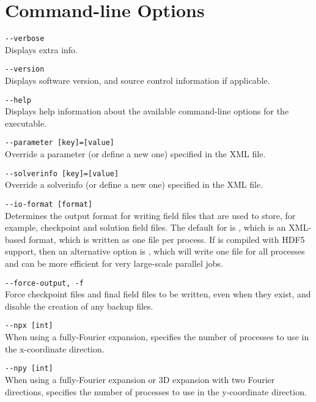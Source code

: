 \chapter{Command-line Options}
\label{command_line}
\lstinline[style=BashInputStyle]{--verbose}\\
\hangindent=1.5cm
Displays extra info.

\lstinline[style=BashInputStyle]{--version}\\
\hangindent=1.5cm
Displays software version, and source control information if applicable.

\lstinline[style=BashInputStyle]{--help}\\
\hangindent=1.5cm
Displays help information about the available command-line options for the executable.

\lstinline[style=BashInputStyle]{--parameter [key]=[value]}\\
\hangindent=1.5cm
Override a parameter (or define a new one) specified in the XML file.

\lstinline[style=BashInputStyle]{--solverinfo [key]=[value]}\\
\hangindent=1.5cm
Override a solverinfo (or define a new one) specified in the XML file.

\lstinline[style=BashInputStyle]{--io-format [format]}\\
\hangindent=1.5cm Determines the output format for writing \nekpp field files
that are used to store, for example, checkpoint and solution field files. The
default for  is , which is an XML-based format, which
is written as one file per process. If \nekpp is compiled with HDF5 support,
then an alternative option is , which will write one file for all
processes and can be more efficient for very large-scale parallel jobs.

\lstinline[style=BashInputStyle]{--force-output, -f}\\
\hangindent=1.5cm
Force checkpoint files and final field files to be written, even when they exist, and disable the creation of any backup files.

\lstinline[style=BashInputStyle]{--npx [int]}\\
\hangindent=1.5cm
When using a fully-Fourier expansion, specifies the number of processes to use in the x-coordinate direction.

\lstinline[style=BashInputStyle]{--npy [int]}\\
\hangindent=1.5cm
\quad When using a fully-Fourier expansion or 3D expansion with two Fourier directions, specifies the number of processes to use in the y-coordinate direction.

